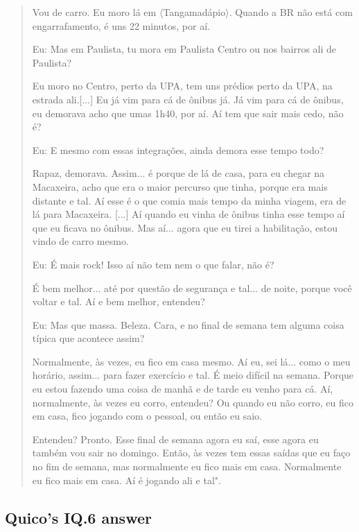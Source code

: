 \begin{quote}
    Vou de carro. Eu moro lá em $\langle$Tangamadápio$\rangle$. Quando a BR não está com engarrafamento, é uns 22 minutos, por aí.

    \colorbox{black!15}{Eu: Mas em Paulista, tu mora em Paulista Centro ou nos bairros ali de Paulista?}
    
    Eu moro no Centro, perto da UPA, tem uns prédios perto da UPA, na estrada ali.[...] Eu já vim para cá de ônibus já. Já vim para cá de ônibus, eu demorava acho que umas 1h40, por aí. Aí tem que sair mais cedo, não é? 

    \colorbox{black!15}{Eu: E mesmo com essas integrações, ainda demora esse tempo todo?}

    Rapaz, demorava. Assim... é porque de lá de casa, para eu chegar na Macaxeira, acho que era o maior percurso que tinha, porque era mais distante e tal. Aí esse é o que comia mais tempo da minha viagem, era de lá para Macaxeira. [...] Aí quando eu vinha de ônibus tinha esse tempo aí que eu ficava no ônibus. Mas aí... agora que eu tirei a habilitação, estou vindo de carro mesmo. 

    \colorbox{black!15}{Eu: É mais rock! Isso aí não tem nem o que falar, não é?}

    É bem melhor... até por questão de segurança e tal... de noite, porque você voltar e tal. Aí e bem melhor, entendeu?
    
    \colorbox{black!15}{Eu: Mas que massa. Beleza. Cara, e no final de semana tem alguma coisa típica}
    \colorbox{black!15}{que acontece assim?}

    Normalmente, às vezes, eu fico em casa mesmo. Aí eu, sei lá... como o meu horário, assim... para fazer exercício e tal. É meio difícil na semana. Porque eu estou fazendo uma coisa de manhã e de tarde eu venho para cá. Aí, normalmente, às vezes eu corro, entendeu? Ou quando eu não corro, eu fico em casa, fico jogando com o pessoal, ou então eu saio.

    Entendeu? Pronto. Esse final de semana agora eu saí, esse agora eu também vou sair no domingo. Então, às vezes tem essas saídas que eu faço no fim de semana, mas normalmente eu fico mais em casa. Normalmente eu fico mais em casa. Aí é jogando ali e tal".
\end{quote}

\subsection{Quico’s IQ.6 answer}
\label{interview-exc-ss:quico-iq6}

